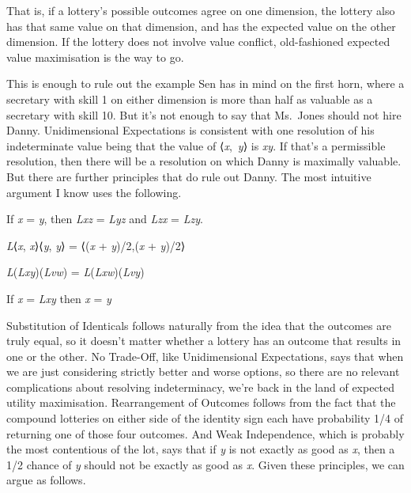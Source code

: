 \documentclass[
  11pt,
  letterpaper,
  DIV=11,
  numbers=noendperiod,
  twoside]{scrartcl}
\providecommand{\tightlist}{%
  \setlength{\itemsep}{0pt}\setlength{\parskip}{0pt}}
\begin{document}
That is, if a lottery's possible outcomes agree on one dimension, the
lottery also has that same value on that dimension, and has the expected
value on the other dimension. If the lottery does not involve value
conflict, old-fashioned expected value maximisation is the way to go.

This is enough to rule out the example Sen has in mind on the first
horn, where a secretary with skill 1 on either dimension is more than
half as valuable as a secretary with skill 10. But it's not enough to
say that Ms.~Jones should not hire Danny. Unidimensional Expectations is
consistent with one resolution of his indeterminate value being that the
value of ⟨\emph{x},~\emph{y}⟩ is \emph{xy}. If that's a permissible
resolution, then there will be a resolution on which Danny is maximally
valuable. But there are further principles that do rule out Danny. The
most intuitive argument I know uses the following.

\begin{description}
\tightlist
\item[Substitution of Identicals (SI)]
If \emph{x} = \emph{y}, then \emph{Lxz} = \emph{Lyz} and \emph{Lzx} =
\emph{Lzy}.
\item[No Trade-Off (NT)]
\emph{L}⟨\emph{x}, \emph{x}⟩⟨\emph{y}, \emph{y}⟩ = ⟨(\emph{x} +
\emph{y})/2,(\emph{x} + \emph{y})/2⟩
\item[Rearrangement of Outcomes (RO)]
\emph{L}(\emph{Lxy})(\emph{Lvw}) = \emph{L}(\emph{Lxw})(\emph{Lvy})
\item[Weak Independence (WI)]
If \emph{x} = \emph{Lxy} then \emph{x} = \emph{y}
\end{description}

Substitution of Identicals follows naturally from the idea that the
outcomes are truly equal, so it doesn't matter whether a lottery has an
outcome that results in one or the other. No Trade-Off, like
Unidimensional Expectations, says that when we are just considering
strictly better and worse options, so there are no relevant
complications about resolving indeterminacy, we're back in the land of
expected utility maximisation. Rearrangement of Outcomes follows from
the fact that the compound lotteries on either side of the identity sign
each have probability 1/4 of returning one of those four outcomes. And
Weak Independence, which is probably the most contentious of the lot,
says that if \emph{y} is not exactly as good as \emph{x}, then a 1/2
chance of \emph{y} should not be exactly as good as \emph{x}. Given
these principles, we can argue as follows.
\end{document}
